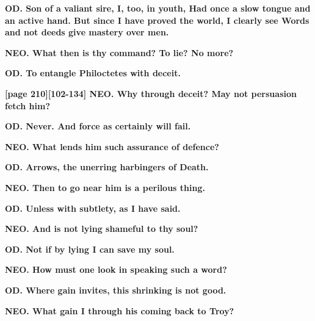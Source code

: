 \documentclass[11pt,letter]{book}
\begin{document}
\par \textbf{OD. Son of a valiant sire, I, too, in youth, Had once a slow tongue and an active hand. But since I have proved the world, I clearly see Words and not deeds give mastery over men.}
\par 

\par \textbf{NEO. What then is thy command? To lie? No more?}
\par 

\par \textbf{OD. To entangle Philoctetes with deceit.}
\par 

\par \textbf{[page 210][102-134] NEO. Why through deceit? May not persuasion fetch him?}
\par 

\par \textbf{OD. Never. And force as certainly will fail.}
\par 

\par \textbf{NEO. What lends him such assurance of defence?}
\par 

\par \textbf{OD. Arrows, the unerring harbingers of Death.}
\par 

\par \textbf{NEO. Then to go near him is a perilous thing.}
\par 

\par \textbf{OD. Unless with subtlety, as I have said.}
\par 

\par \textbf{NEO. And is not lying shameful to thy soul?}
\par 

\par \textbf{OD. Not if by lying I can save my soul.}
\par 

\par \textbf{NEO. How must one look in speaking such a word?}
\par 

\par \textbf{OD. Where gain invites, this shrinking is not good.}
\par 

\par \textbf{NEO. What gain I through his coming back to Troy?}
\par 
\end{document}
